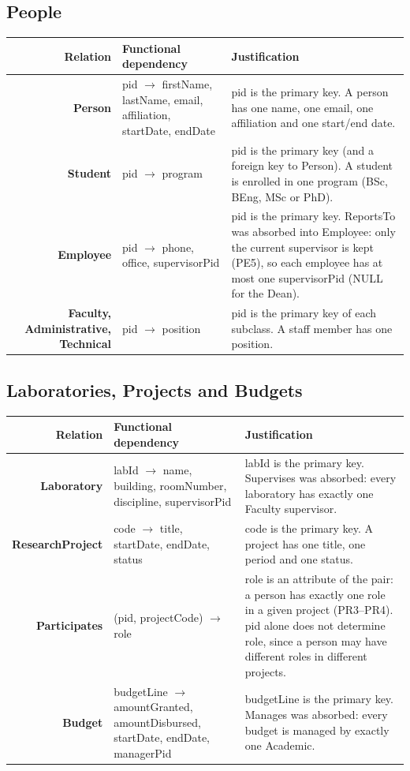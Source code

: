\documentclass[11pt,a4paper]{article}
\newcommand{\fd}{\ensuremath{\rightarrow}}
\newcommand{\rel}[1]{\textbf{#1}}
\begin{document}
\subsection{People}
\begin{longtable}{R F J}
\toprule
\textbf{Relation} & \textbf{Functional dependency} & \textbf{Justification}\\
\midrule
\endhead
\rel{Person} & pid \fd{} firstName, lastName, email, affiliation, startDate, endDate & pid is the primary key. A person has one name, one email, one affiliation and one start/end date.\\
\rel{Student} & pid \fd{} program & pid is the primary key (and a foreign key to Person). A student is enrolled in one program (BSc, BEng, MSc or PhD).\\
\rel{Employee} & pid \fd{} phone, office, supervisorPid & pid is the primary key. ReportsTo was absorbed into Employee: only the current supervisor is kept (PE5), so each employee has at most one supervisorPid (NULL for the Dean).\\
\rel{Faculty, Administrative, Technical} & pid \fd{} position & pid is the primary key of each subclass. A staff member has one position.\\
\bottomrule
\end{longtable}

\subsection{Laboratories, Projects and Budgets}
\begin{longtable}{R F J}
\toprule
\textbf{Relation} & \textbf{Functional dependency} & \textbf{Justification}\\
\midrule
\endhead
\rel{Laboratory} & labId \fd{} name, building, roomNumber, discipline, supervisorPid & labId is the primary key. Supervises was absorbed: every laboratory has exactly one Faculty supervisor.\\
\rel{ResearchProject} & code \fd{} title, startDate, endDate, status & code is the primary key. A project has one title, one period and one status.\\
\rel{Participates} & (pid, projectCode) \fd{} role & role is an attribute of the pair: a person has exactly one role in a given project (PR3--PR4). pid alone does not determine role, since a person may have different roles in different projects.\\
\rel{Budget} & budgetLine \fd{} amountGranted, amountDisbursed, startDate, endDate, managerPid & budgetLine is the primary key. Manages was absorbed: every budget is managed by exactly one Academic.\\
\bottomrule
\end{longtable}
\end{document}
